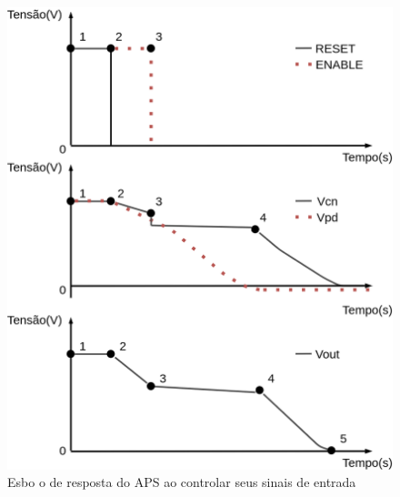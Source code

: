 \begin{figure}[htb]
	\caption{\label{figura_estagiosAPS}Esbo o de resposta do APS ao controlar seus sinais de entrada}
	\begin{center}
	    \includegraphics[scale=0.2]{Imagens/estagiosAPS.png}
	\end{center}
\end{figure}

